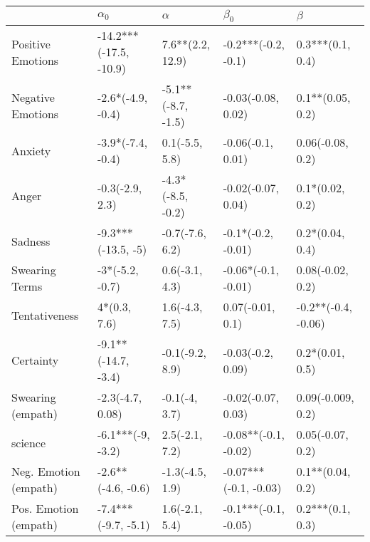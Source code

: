 \begin{tabular}{lllll}
\toprule
{} &              $\alpha_0$ &            $\alpha$ &              $\beta_0$ &              $\beta$ \\
\midrule
Positive Emotions     &  -14.2***(-17.5, -10.9) &    7.6**(2.2, 12.9) &    -0.2***(-0.2, -0.1) &     0.3***(0.1, 0.4) \\
Negative Emotions     &       -2.6*(-4.9, -0.4) &  -5.1**(-8.7, -1.5) &     -0.03(-0.08, 0.02) &     0.1**(0.05, 0.2) \\
Anxiety               &       -3.9*(-7.4, -0.4) &      0.1(-5.5, 5.8) &      -0.06(-0.1, 0.01) &     0.06(-0.08, 0.2) \\
Anger                 &         -0.3(-2.9, 2.3) &   -4.3*(-8.5, -0.2) &     -0.02(-0.07, 0.04) &      0.1*(0.02, 0.2) \\
Sadness               &      -9.3***(-13.5, -5) &     -0.7(-7.6, 6.2) &     -0.1*(-0.2, -0.01) &      0.2*(0.04, 0.4) \\
Swearing Terms        &         -3*(-5.2, -0.7) &      0.6(-3.1, 4.3) &    -0.06*(-0.1, -0.01) &     0.08(-0.02, 0.2) \\
Tentativeness         &            4*(0.3, 7.6) &      1.6(-4.3, 7.5) &       0.07(-0.01, 0.1) &  -0.2**(-0.4, -0.06) \\
Certainty             &     -9.1**(-14.7, -3.4) &     -0.1(-9.2, 8.9) &      -0.03(-0.2, 0.09) &      0.2*(0.01, 0.5) \\
Swearing (empath)     &        -2.3(-4.7, 0.08) &       -0.1(-4, 3.7) &     -0.02(-0.07, 0.03) &    0.09(-0.009, 0.2) \\
science               &       -6.1***(-9, -3.2) &      2.5(-2.1, 7.2) &   -0.08**(-0.1, -0.02) &     0.05(-0.07, 0.2) \\
Neg. Emotion (empath) &      -2.6**(-4.6, -0.6) &     -1.3(-4.5, 1.9) &  -0.07***(-0.1, -0.03) &     0.1**(0.04, 0.2) \\
Pos. Emotion (empath) &     -7.4***(-9.7, -5.1) &      1.6(-2.1, 5.4) &   -0.1***(-0.1, -0.05) &     0.2***(0.1, 0.3) \\
\bottomrule
\end{tabular}
